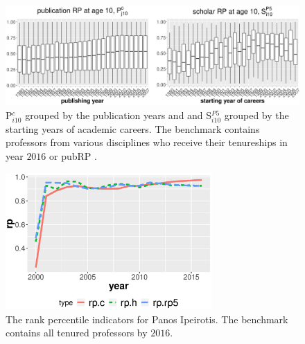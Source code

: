 \clearpage
\begin{figure}[ht!]
    \centering
    \includegraphics[width=\textwidth]{figures/exploratory/stationarity.eps}
    \caption{P$_{i10}^c$ grouped by the publication years and and S$_{i10}^{P5}$ grouped by the starting years of academic careers. The benchmark contains professors from various disciplines who receive their tenureships in year $2016$ or pubRP .}
    \label{fig:stableness_rp}
\end{figure}


\begin{figure}[ht!]
    \centering
    \includegraphics[width=0.7\textwidth]{figures/compare_autrp/panos.eps}
    \caption{The rank percentile indicators for Panos Ipeirotis. The benchmark contains all tenured professors by $2016$.}
    \label{fig:panos}
\end{figure}



